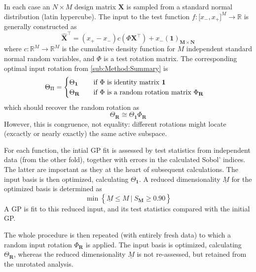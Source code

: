 \documentclass[preprint,12pt]{elsarticle}
\newcommand*{\M}[1]{\ensuremath{#1}\xspace}
\newcommand*{\vr}[1]{\M{\mathbf{#1}}}
\newcommand*{\st}[1]{\M{\mathbb{#1}}}
\newcommand{\T}[1]{\text{#1}}
\newcommand*{\QT}[2][]{\M{\quad\T{#2}\ifthenelse{\equal{#1}{}}{\quad}{#1}}}
\newcommand*{\setbuilder}[2]{\M{\left\lbrace#1 \: \big\vert \: #2\right\rbrace}}
\begin{document}
        In each case an \M{N \times M} design matrix \vr{X} is sampled from a standard normal distribution (latin hypercube). 
        The input to the test function \M{f\colon \lbrack x_-, x_+ \rbrack^{M} \to \st{R}} is generally constructed as
        \begin{equation} \label{def:Xhat}
            \vr{\hat{X}}^{\intercal} = (x_+ - x_-) c(\Phi \vr{X}^{\intercal}) + x_-(\vr{1})_{\vr{M} \times \vr{N}}
        \end{equation}
        where \M{c\colon \st{R}^M\to\st{R}^M} is the cumulative density function for \M{M} independent standard normal random variables, and \M{\Phi} is a test rotation matrix. 
        The corresponding optimal input rotation from \cref{sub:Method:Summary} is
        \begin{equation}
            \Theta_{\Pi} = \begin{cases}
                \Theta_{\vr{1}} & \QT{if \M{\Phi} is identity matrix \M{\vr{1}}} \\
                \Theta_{\vr{R}} & \QT{if \M{\Phi} is a random rotation matrix \M{\Phi_{\vr{R}}}}
            \end{cases}
        \end{equation}
        which should recover the random rotation as
        \begin{equation}
            \Theta_{\vr{R}} \cong \Theta_{\vr{1}} \Phi_{\vr{R}}
        \end{equation}
        However, this is congruence, not equality: different rotations might locate (excactly or nearly exactly) the same active subspace.

        For each function, the intial GP fit is assessed by test statistics from independent data (from the other fold), together with errors in the calculated Sobol' indices. The latter are important as they at the heart of subsequent calculations. The input basis is then optimized, calculating $\Theta_{\vr{1}}$.
        A reduced dimensionality \M{\underline{M}} for the optimized basis is determined as 
        \begin{equation} \label{eq:Results:Mbar}
            \min \setbuilder{\underline{M} \leq M}{S_{\underline{\vr{M}}} \geq 0.90}
        \end{equation}
        A GP is fit to this reduced input, and its test statistics compared with the initial GP.

        The whole procedure is then repeated (with entirely fresh data) to which a random input rotation $\Phi_{\vr{R}}$ is applied. The input basis is optimized, calculating $\Theta_{\vr{R}}$, whereas the reduced dimensionality \M{\underline{M}} is not re-assessed, but retained from the unrotated analysis.
\end{document}
